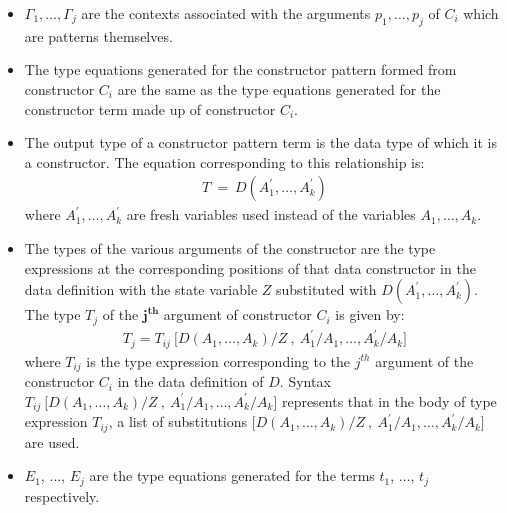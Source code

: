\documentclass[11pt]{article}
\begin{document}
\begin{itemize}
  \item ${\Gamma_1,\ldots,\Gamma_j}$ are the contexts associated with the arguments ${p_1,\ldots,p_j}$ of ${C_i}$ which are patterns themselves.
  \item The type equations generated for the constructor pattern formed from constructor ${C_i}$ are the same as the type equations generated for the constructor term made up of constructor ${C_i}$.
  \item The output type of a constructor pattern term is the data type of which it is a constructor. The equation corresponding to this relationship is:
   \begin{align*}
    T~=~D(A_1^{\prime},\ldots,A_k^{\prime})
   \end{align*}
   where ${A_1^{\prime},\ldots,A_k^{\prime}}$ are fresh variables used instead of the variables ${A_1,\ldots,A_k}$.
    
  \item The types of the various arguments of the constructor are the type expressions at the corresponding positions of that data constructor in the data definition with the state variable ${Z}$ substituted with ${D(A_1^{\prime},\ldots,A_k^{\prime})}$. The type ${T_j}$ of the $\mathbf {j^{th}}$ argument of constructor ${C_i}$ is given by:
  \begin{align*}
    T_j = T_{ij}~\big[D(A_1,\ldots,A_k)/Z~,~A_1^{\prime}/A_1,\ldots,A_k^{\prime}/A_k\big]
  \end{align*}
  where ${T_{ij}}$ is the type expression corresponding to the ${j^{th}}$ argument of the constructor ${C_i}$ in the data definition of ${D}$. Syntax ${T_{ij}~\big[D(A_1,\ldots,A_k)/Z~,~A_1^{\prime}/A_1,\ldots,A_k^{\prime}/A_k\big]}$ represents that in the body of type expression
   ${T_{ij}}$, a list of substitutions $\big[D(A_1,\ldots,A_k)/Z~,~A_1^{\prime}/A_1,\ldots,A_k^{\prime}/A_k\big]$ are used. 

  \item $E_1$, $\ldots$, $E_j$ are the type equations generated for the terms $t_1$, $\ldots$, $t_j$ respectively.
 \end{itemize}
\end{document}
